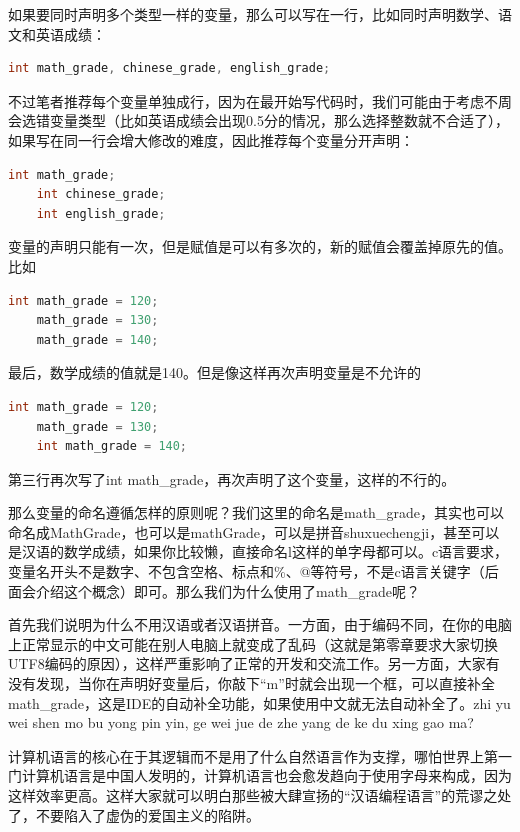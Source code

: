 如果要同时声明多个类型一样的变量，那么可以写在一行，比如同时声明数学、语文和英语成绩：

\begin{lstlisting}[language=C]
    int math_grade, chinese_grade, english_grade;
\end{lstlisting}

不过笔者推荐每个变量单独成行，因为在最开始写代码时，我们可能由于考虑不周会选错变量类型（比如英语成绩会出现0.5分的情况，那么选择整数就不合适了），如果写在同一行会增大修改的难度，因此推荐每个变量分开声明：

\begin{lstlisting}[language=C]
    int math_grade;
    int chinese_grade;
    int english_grade;
\end{lstlisting}

变量的声明只能有一次，但是赋值是可以有多次的，新的赋值会覆盖掉原先的值。比如

\begin{lstlisting}[language=C]
    int math_grade = 120;
    math_grade = 130; 
    math_grade = 140;
\end{lstlisting}

最后，数学成绩的值就是140。但是像这样再次声明变量是不允许的

\begin{lstlisting}[language=C]
    int math_grade = 120;
    math_grade = 130; 
    int math_grade = 140;
\end{lstlisting}

第三行再次写了int math\_grade，再次声明了这个变量，这样的不行的。

那么变量的命名遵循怎样的原则呢？我们这里的命名是math\_grade，其实也可以命名成MathGrade，也可以是mathGrade，可以是拼音shuxuechengji，甚至可以是汉语的数学成绩，如果你比较懒，直接命名l这样的单字母都可以。c语言要求，变量名开头不是数字、不包含空格、标点和\%、@等符号，不是c语言关键字（后面会介绍这个概念）即可。那么我们为什么使用了math\_grade呢？

首先我们说明为什么不用汉语或者汉语拼音。一方面，由于编码不同，在你的电脑上正常显示的中文可能在别人电脑上就变成了乱码（这就是第零章要求大家切换UTF8编码的原因），这样严重影响了正常的开发和交流工作。另一方面，大家有没有发现，当你在声明好变量后，你敲下“m”时就会出现一个框，可以直接补全math\_grade，这是IDE的自动补全功能，如果使用中文就无法自动补全了。zhi yu wei shen mo bu yong pin yin, ge wei jue de zhe yang de ke du xing gao ma?

计算机语言的核心在于其逻辑而不是用了什么自然语言作为支撑，哪怕世界上第一门计算机语言是中国人发明的，计算机语言也会愈发趋向于使用字母来构成，因为这样效率更高。这样大家就可以明白那些被大肆宣扬的“汉语编程语言”的荒谬之处了，不要陷入了虚伪的爱国主义的陷阱。

